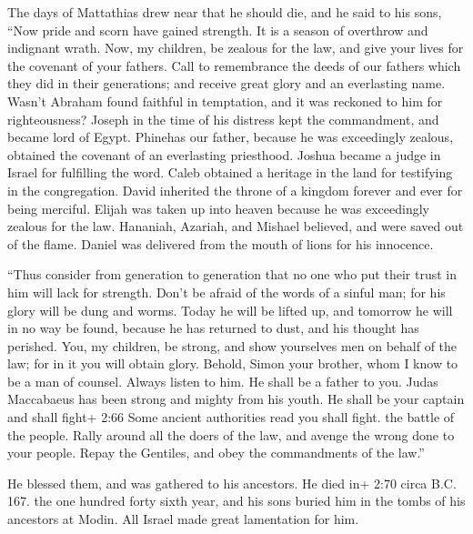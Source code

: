  The days of Mattathias drew near that he should die, and
he said to his sons, ``Now pride and scorn have gained strength. It is a
season of overthrow and indignant wrath.  Now, my children,
be zealous for the law, and give your lives for the covenant of your
fathers.  Call to remembrance the deeds of our fathers
which they did in their generations; and receive great glory and an
everlasting name.  Wasn't Abraham found faithful in
temptation, and it was reckoned to him for righteousness? 
Joseph in the time of his distress kept the commandment, and became lord
of Egypt.  Phinehas our father, because he was exceedingly
zealous, obtained the covenant of an everlasting priesthood.
 Joshua became a judge in Israel for fulfilling the word.
 Caleb obtained a heritage in the land for testifying in
the congregation.  David inherited the throne of a kingdom
forever and ever for being merciful.  Elijah was taken up
into heaven because he was exceedingly zealous for the law.
 Hananiah, Azariah, and Mishael believed, and were saved
out of the flame.  Daniel was delivered from the mouth of
lions for his innocence.

 ``Thus consider from generation to generation that no one
who put their trust in him will lack for strength.  Don't
be afraid of the words of a sinful man; for his glory will be dung and
worms.  Today he will be lifted up, and tomorrow he will in
no way be found, because he has returned to dust, and his thought has
perished.  You, my children, be strong, and show yourselves
men on behalf of the law; for in it you will obtain glory. 
Behold, Simon your brother, whom I know to be a man of counsel. Always
listen to him. He shall be a father to you.  Judas
Maccabaeus has been strong and mighty from his youth. He shall be your
captain and shall fight+ 2:66 Some ancient authorities read you shall
fight. the battle of the people.  Rally around all the
doers of the law, and avenge the wrong done to your people.
 Repay the Gentiles, and obey the commandments of the
law.''

 He blessed them, and was gathered to his ancestors.
 He died in+ 2:70 circa B.C. 167. the one hundred forty
sixth year, and his sons buried him in the tombs of his ancestors at
Modin. All Israel made great lamentation for him.

